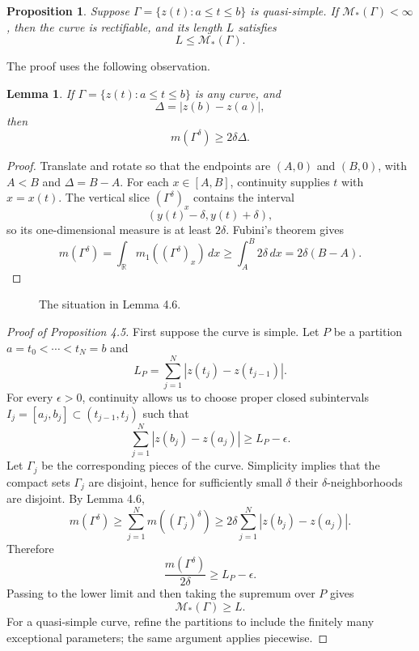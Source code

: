 \documentclass[11pt,openany]{book}
\newtheorem{lemma}[theorem]{Lemma}
\newtheorem{proposition}[theorem]{Proposition}
\begin{document}
\begin{proposition}
Suppose $\Gamma=\{z(t):a\le t\le b\}$ is quasi-simple. If $\mathcal M_*(\Gamma)<\infty$, then the curve is rectifiable, and its length $L$ satisfies
\[
L\le\mathcal M_*(\Gamma).
\]
\end{proposition}

The proof uses the following observation.

\begin{lemma}
If $\Gamma=\{z(t):a\le t\le b\}$ is any curve, and
\[
\Delta=|z(b)-z(a)|,
\]
then
\[
m(\Gamma^\delta)\ge2\delta\Delta.
\]
\end{lemma}

\begin{proof}
Translate and rotate so that the endpoints are $(A,0)$ and $(B,0)$, with $A<B$ and $\Delta=B-A$. For each $x\in[A,B]$, continuity supplies $t$ with $x=x(t)$. The vertical slice $(\Gamma^\delta)_x$ contains the interval
\[
(y(t)-\delta,y(t)+\delta),
\]
so its one-dimensional measure is at least $2\delta$. Fubini's theorem gives
\[
m(\Gamma^\delta)
=\int_{\mathbb R}m_1((\Gamma^\delta)_x)\,dx
\ge\int_A^B2\delta\,dx
=2\delta(B-A).
\]
\end{proof}

\begin{figure}[ht]
\centering
{}
\caption{The situation in Lemma 4.6.}
\end{figure}

\begin{proof}[Proof of Proposition 4.5]
First suppose the curve is simple. Let $P$ be a partition $a=t_0<\cdots<t_N=b$ and
\[
L_P=\sum_{j=1}^N|z(t_j)-z(t_{j-1})|.
\]
For every $\epsilon>0$, continuity allows us to choose proper closed subintervals $I_j=[a_j,b_j]\subset(t_{j-1},t_j)$ such that
\[
\sum_{j=1}^N|z(b_j)-z(a_j)|\ge L_P-\epsilon.
\]
Let $\Gamma_j$ be the corresponding pieces of the curve. Simplicity implies that the compact sets $\Gamma_j$ are disjoint, hence for sufficiently small $\delta$ their $\delta$-neighborhoods are disjoint. By Lemma 4.6,
\[
m(\Gamma^\delta)
\ge\sum_{j=1}^Nm((\Gamma_j)^\delta)
\ge2\delta\sum_{j=1}^N|z(b_j)-z(a_j)|.
\]
Therefore
\[
\frac{m(\Gamma^\delta)}{2\delta}\ge L_P-\epsilon.
\]
Passing to the lower limit and then taking the supremum over $P$ gives
\[
\mathcal M_*(\Gamma)\ge L.
\]
For a quasi-simple curve, refine the partitions to include the finitely many exceptional parameters; the same argument applies piecewise.
\end{proof}
\end{document}

